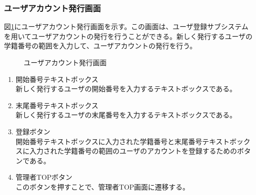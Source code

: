 \documentclass[a4j]{jarticle}
\begin{document}
\subsubsection{ユーザアカウント発行画面}
図\ref{fig:create_user}にユーザアカウント発行画面を示す。この画面は、ユーザ登録サブシステムを用いてユーザアカウントの発行を行うことができる。新しく発行するユーザの学籍番号の範囲を入力して、ユーザアカウントの発行を行う。
\begin{figure}[H]
\centering
{}
\caption{ユーザアカウント発行画面}
\label{fig:create_user}
\end{figure}

\begin{enumerate}
  \renewcommand{\labelenumi}{\textcircled{\scriptsize \theenumi}}

\item 開始番号テキストボックス\\
  新しく発行するユーザの開始番号を入力するテキストボックスである。
\item 末尾番号テキストボックス\\
  新しく発行するユーザの末尾番号を入力するテキストボックスである。
\item 登録ボタン\\
  開始番号テキストボックスに入力された学籍番号と末尾番号テキストボックスに入力された学籍番号の範囲のユーザのアカウントを登録するためのボタンである。
  \item 管理者TOPボタン\\
  このボタンを押すことで、管理者TOP画面に遷移する。
\end{enumerate}
\end{document}
